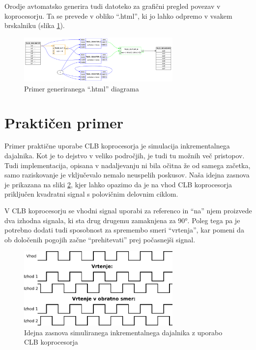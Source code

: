 \documentclass[a4paper]{article}
\begin{document}
\begin{sloppypar}
Orodje avtomatsko generira tudi datoteko za grafični pregled povezav v
koprocesorju. Ta se prevede v obliko ``.html'', ki jo lahko odpremo v vsakem
brskalniku (slika \ref{fig:clbtool_diagram})\cite[Pogl.~1]{clb-user-guide}.

\begin{figure}[htb]
    \centerline{\includegraphics[width=8cm]{html_diagram}}
    \caption{Primer generiranega ``.html'' diagrama}
    \label{fig:clbtool_diagram} 
\end{figure} 



\section{Praktičen primer}

Primer praktične uporabe CLB koprocesorja je simulacija inkrementalnega
dajalnika. Kot je to dejstvo v veliko področjih, je tudi tu možnih več
pristopov. Tudi implementacija, opisana v nadaljevanju ni bila očitna že od
samega začetka, samo raziskovanje je vključevalo nemalo neuspelih poskusov.
Naša idejna zasnova je prikazana na sliki \ref{fig:enkoder_zasnova}, kjer lahko
opazimo da je na vhod CLB koprocesorja priključen kvadratni signal s polovičnim
delovnim ciklom.

V CLB koprocesorju se vhodni signal uporabi za referenco in ``na'' njem
proizvede dva izhodna signala, ki sta drug drugemu zamaknjena za 90°. Poleg
tega pa je potrebno dodati tudi sposobnost za spremembo smeri ``vrtenja'', kar
pomeni da ob določenih pogojih začne ``prehitevati'' prej počasnejši signal.

\begin{figure}[htb]
    \centerline{\includegraphics[width=8cm]{enkoder_zasnova}}
    \caption{Idejna zasnova simuliranega inkrementalnega dajalnika z uporabo
             CLB koprocesorja}
    \label{fig:enkoder_zasnova} 
\end{figure} 


\end{sloppypar}
\end{document}
